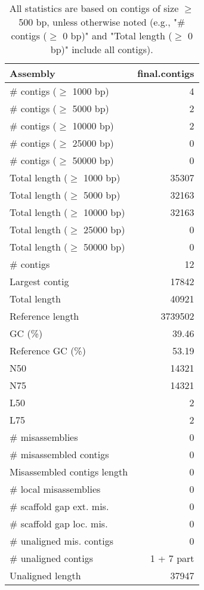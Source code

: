 \documentclass[12pt,a4paper]{article}
\begin{document}
\begin{table}[ht]
\begin{center}
\caption{All statistics are based on contigs of size $\geq$ 500 bp, unless otherwise noted (e.g., "\# contigs ($\geq$ 0 bp)" and "Total length ($\geq$ 0 bp)" include all contigs).}
\begin{tabular}{|l*{1}{|r}|}
\hline
Assembly & final.contigs \\ \hline
\# contigs ($\geq$ 1000 bp) & 4 \\ \hline
\# contigs ($\geq$ 5000 bp) & 2 \\ \hline
\# contigs ($\geq$ 10000 bp) & 2 \\ \hline
\# contigs ($\geq$ 25000 bp) & 0 \\ \hline
\# contigs ($\geq$ 50000 bp) & 0 \\ \hline
Total length ($\geq$ 1000 bp) & 35307 \\ \hline
Total length ($\geq$ 5000 bp) & 32163 \\ \hline
Total length ($\geq$ 10000 bp) & 32163 \\ \hline
Total length ($\geq$ 25000 bp) & 0 \\ \hline
Total length ($\geq$ 50000 bp) & 0 \\ \hline
\# contigs & 12 \\ \hline
Largest contig & 17842 \\ \hline
Total length & 40921 \\ \hline
Reference length & 3739502 \\ \hline
GC (\%) & 39.46 \\ \hline
Reference GC (\%) & 53.19 \\ \hline
N50 & 14321 \\ \hline
N75 & 14321 \\ \hline
L50 & 2 \\ \hline
L75 & 2 \\ \hline
\# misassemblies & 0 \\ \hline
\# misassembled contigs & 0 \\ \hline
Misassembled contigs length & 0 \\ \hline
\# local misassemblies & 0 \\ \hline
\# scaffold gap ext. mis. & 0 \\ \hline
\# scaffold gap loc. mis. & 0 \\ \hline
\# unaligned mis. contigs & 0 \\ \hline
\# unaligned contigs & 1 + 7 part \\ \hline
Unaligned length & 37947 \\ \hline

\end{tabular}
\end{center}
\end{table}
\end{document}
